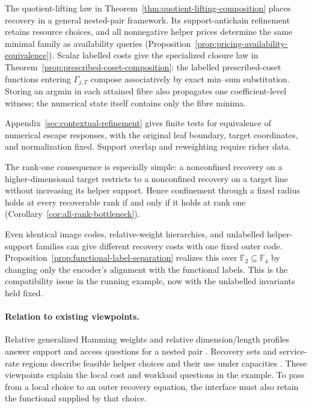 \documentclass[11pt]{article}
\theoremstyle{definition}
\newcommand{\F}{\mathbb F}
\begin{document}
The quotient-lifting law in Theorem~\ref{thm:quotient-lifting-composition}
places recovery in a general nested-pair framework.  Its support-antichain
refinement retains resource choices, and all nonnegative helper prices
determine the same minimal family as availability queries
(Proposition~\ref{prop:pricing-availability-equivalence}).  Scalar labelled
costs give the specialized closure law in
Theorem~\ref{prop:prescribed-coset-composition}: the labelled
prescribed-coset functions entering $\Gamma_{j,T}$ compose associatively by
exact min--sum substitution.  Storing an argmin in each attained fibre also
propagates one coefficient-level witness; the numerical state itself contains
only the fibre minima.

Appendix~\ref{sec:contextual-refinement} gives finite tests for equivalence of
numerical escape responses, with the original leaf boundary, target coordinates,
and normalization fixed.  Support overlap and reweighting require richer data.

The rank-one consequence is especially simple: a nonconfined recovery on a
higher-dimensional target restricts to a nonconfined recovery on a target
line without increasing its helper support.  Hence confinement through a
fixed radius holds at every recoverable rank if and only if it holds at rank
one (Corollary~\ref{cor:all-rank-bottleneck}).

Even identical image codes, relative-weight hierarchies, and unlabelled
helper-support families can give different recovery costs with one fixed
outer code.  Proposition~\ref{prop:functional-label-separation} realizes this
over $\F_2\subseteq\F_4$ by changing only the encoder's alignment with the
functional labels.  This is the compatibility issue in the running example,
now with the unlabelled invariants held fixed.

\paragraph{Relation to existing viewpoints.}
Relative generalized Hamming weights and relative dimension/length profiles
answer support and access questions for a nested pair
\cite{LuoEtAl2005,KuriharaUyematsuMatsumoto2012,GeilEtAl2014}.
Recovery sets and service-rate regions describe feasible helper choices and
their use under capacities \cite{GopalanEtAl2012,AktasEtAl2021}.
These viewpoints explain the local cost and workload questions in the example.
To pass from a local choice to an outer recovery equation, the interface must
also retain the functional supplied by that choice.
\end{document}
